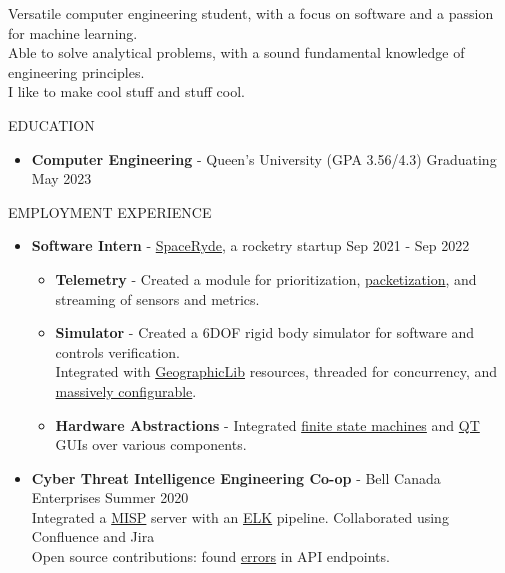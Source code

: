 \documentclass{resume} %
\begin{document}
Versatile computer engineering student, with a focus on software and a passion for machine learning.\\
Able to solve analytical problems, with a sound fundamental knowledge of engineering principles.\\
I like to make cool stuff and stuff cool.

\begin{rSection}{EDUCATION}
\begin{itemize}
    \item {\bf Computer Engineering} - Queen's University (GPA 3.56/4.3) \hfill {Graduating May 2023}
\end{itemize}
\end{rSection}

\begin{rSection}{EMPLOYMENT EXPERIENCE}
\begin{itemize}
    \item {\bf Software Intern} - \href{https://youtu.be/-21FYbKWdd0}{SpaceRyde}, a rocketry startup \hfill {Sep 2021 - Sep 2022}
    \begin{itemize}
        \setlength\itemsep{-0.5em}
        \item[\textbullet] {\bf Telemetry} - Created a module for prioritization, \href{http://libtins.github.io/}{packetization}, and streaming of sensors and metrics.
        \item[\textbullet] {\bf Simulator} - Created a 6DOF rigid body simulator for software and controls verification.\\
        Integrated with \href{https://geographiclib.sourceforge.io/C++/doc/index.html}{GeographicLib} resources, threaded for concurrency, and \href{https://github.com/jbeder/yaml-cpp}{massively configurable}.
        \item[\textbullet] {\bf Hardware Abstractions} - Integrated \href{https://en.wikipedia.org/wiki/Finite-state_machine}{finite state machines} and \href{https://wiki.qt.io/Qt_for_Beginners}{QT} GUIs over various components. 
    \end{itemize}
    \item {\bf Cyber Threat Intelligence Engineering Co-op} - Bell Canada Enterprises \hfill {Summer 2020}\\
    Integrated a \href{https://www.misp-project.org/}{MISP} server with an \href{https://www.elastic.co/what-is/elk-stack}{ELK} pipeline. Collaborated using Confluence and Jira\\
    Open source contributions: found \href{https://github.com/MISP/PyMISP/issues/588}{errors} in API endpoints.
\end{itemize}
\end{rSection}
\end{document}
